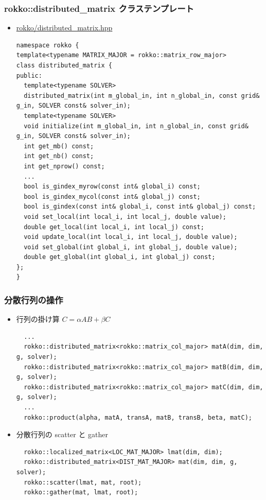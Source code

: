 \begin{frame}[c,fragile]
  \frametitle{rokko::distributed\_matrix クラステンプレート}
  \begin{itemize}
  \item \href{https://github.com/t-sakashita/rokko/blob/master/rokko/distributed_matrix.hpp}{rokko/distributed\_matrix.hpp}
\begin{lstlisting}
namespace rokko {
template<typename MATRIX_MAJOR = rokko::matrix_row_major>
class distributed_matrix {
public:
  template<typename SOLVER>
  distributed_matrix(int m_global_in, int n_global_in, const grid& g_in, SOLVER const& solver_in);
  template<typename SOLVER>
  void initialize(int m_global_in, int n_global_in, const grid& g_in, SOLVER const& solver_in);
  int get_mb() const;
  int get_nb() const;
  int get_nprow() const;
  ...
  bool is_gindex_myrow(const int& global_i) const;
  bool is_gindex_mycol(const int& global_j) const;
  bool is_gindex(const int& global_i, const int& global_j) const;
  void set_local(int local_i, int local_j, double value);
  double get_local(int local_i, int local_j) const;
  void update_local(int local_i, int local_j, double value);
  void set_global(int global_i, int global_j, double value);
  double get_global(int global_i, int global_j) const;
};
}
\end{lstlisting}
  \end{itemize}
\end{frame}

\begin{frame}[c,fragile]
  \frametitle{分散行列の操作}
  \begin{itemize}
  \item 行列の掛け算 $C = \alpha A B + \beta C$
\begin{lstlisting}
  ...
  rokko::distributed_matrix<rokko::matrix_col_major> matA(dim, dim, g, solver);
  rokko::distributed_matrix<rokko::matrix_col_major> matB(dim, dim, g, solver);
  rokko::distributed_matrix<rokko::matrix_col_major> matC(dim, dim, g, solver);
  ...
  rokko::product(alpha, matA, transA, matB, transB, beta, matC);
\end{lstlisting}
  \item 分散行列の scatter と gather
\begin{lstlisting}
  rokko::localized_matrix<LOC_MAT_MAJOR> lmat(dim, dim);
  rokko::distributed_matrix<DIST_MAT_MAJOR> mat(dim, dim, g, solver);
  rokko::scatter(lmat, mat, root);
  rokko::gather(mat, lmat, root);
\end{lstlisting}
  \end{itemize}
\end{frame}

